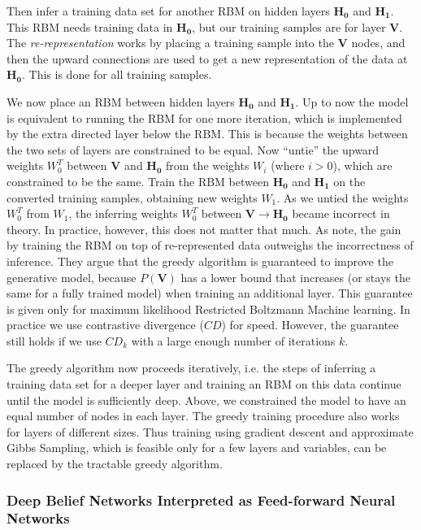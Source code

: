 Then infer a training data set for another RBM on hidden layers $\mathbf{H_{0}}$
and $\mathbf{H_{1}}$. This RBM needs training data in $\mathbf{H_{0}}$,
but our training samples are for layer $\mathbf{V}$. The \emph{re-representation}
works by placing a training sample into the $\mathbf{V}$ nodes, and
then the upward connections are used to get a new representation of
the data at $\mathbf{H_{0}}$. This is done for all training samples.

We now place an RBM between hidden layers $\mathbf{H_{0}}$ and $\mathbf{H_{1}}$.
Up to now the model is equivalent to running the RBM for one more
iteration, which is implemented by the extra directed layer below
the RBM. This is because the weights between the two sets of layers
are constrained to be equal. Now ``untie'' the upward weights
$W_{0}^{T}$ between $\mathbf{V}$ and $\mathbf{H_{0}}$ from the
weights $W_{i}$ (where $i>0$), which are constrained to be the same.
Train the RBM between $\mathbf{H_{0}}$ and $\mathbf{H_{1}}$ on the
converted training samples, obtaining new weights $W_{1}$. As we
untied the weights $W_{0}^{T}$ from $W_{1}$, the inferring weights
$W_{0}^{T}$ between $\mathbf{V}\rightarrow\mathbf{H_{0}}$ became
incorrect in theory. In practice, however, this does not matter that
much. As \cite{HintonTeh2006} note, the gain by training the RBM
on top of re-represented data outweighs the incorrectness of inference.
They argue that the greedy algorithm is guaranteed to improve the
generative model, because $P(\mathbf{V})$ has a lower bound that
increases (or stays the same for a fully trained model) when training
an additional layer. This guarantee is given only for maximum likelihood
Restricted Boltzmann Machine learning. In practice we use contrastive
divergence ($CD$) for speed. However, the guarantee still holds if
we use $CD_{k}$ with a large enough number of iterations $k$.

The greedy algorithm now proceeds iteratively, i.e. the steps of inferring
a training data set for a deeper layer and training an RBM on this
data continue until the model is sufficiently deep. Above, we constrained
the model to have an equal number of nodes in each layer. The greedy
training procedure also works for layers of different sizes. Thus
training using gradient descent and approximate Gibbs Sampling, which
is feasible only for a few layers and variables, can be replaced by
the tractable greedy algorithm.

\subsubsection{Deep Belief Networks Interpreted as Feed-forward Neural Networks}

